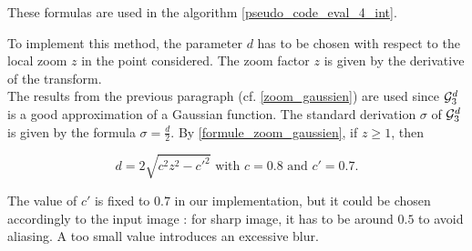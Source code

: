 These formulas are used in the algorithm \ref{pseudo_code_eval_4_int}.






\medbreak


To implement this method, the parameter $d$ has to be chosen with respect to the local zoom $z$ in the point considered. The zoom factor $z$ is given by the derivative of the transform.\\
The results from the previous paragraph (cf. \ref{zoom_gaussien}) are used since $\mathcal{G}_3^d$ is a good approximation of a Gaussian function. The standard derivation $\sigma$ of $\mathcal{G}_3^d$ is given by the formula $\sigma=\frac{d}{2}$. By \eqref{formule_zoom_gaussien}, if $z\ge 1$, then

\begin{equation*}
d=2\sqrt{c^2 z^2 - c'^2} \text{ with } c=0.8 \text{ and } c'=0.7.
\end{equation*}

The value of $c'$ is fixed to $0.7$ in our implementation, but it could be chosen accordingly to the input image : for sharp image, it has to be around $0.5$ to avoid aliasing. A too small value introduces an excessive blur.


